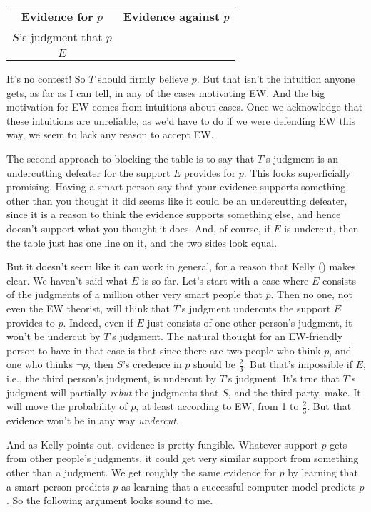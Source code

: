 \documentclass[
  11pt,
  letterpaper,
  DIV=11,
  numbers=noendperiod,
  oneside]{scrartcl}
\begin{document}
\begin{longtable}[]{@{}cc@{}}
\toprule\noalign{}
\endhead
\bottomrule\noalign{}
\endlastfoot
\textbf{Evidence for} \(p\) & \textbf{Evidence against} \(p\) \\
\(S\)'s judgment that \(p\) & \\
\(E\) & \\
\end{longtable}

It's no contest! So \(T\) should firmly believe \(p\). But that isn't
the intuition anyone gets, as far as I can tell, in any of the cases
motivating EW. And the big motivation for EW comes from intuitions about
cases. Once we acknowledge that these intuitions are unreliable, as we'd
have to do if we were defending EW this way, we seem to lack any reason
to accept EW.

The second approach to blocking the table is to say that \(T\)'s
judgment is an undercutting defeater for the support \(E\) provides for
\(p\). This looks superficially promising. Having a smart person say
that your evidence supports something other than you thought it did
seems like it could be an undercutting defeater, since it is a reason to
think the evidence supports something else, and hence doesn't support
what you thought it does. And, of course, if \(E\) is undercut, then the
table just has one line on it, and the two sides look equal.

But it doesn't seem like it can work in general, for a reason that Kelly
() makes clear. We haven't said
what \(E\) is so far. Let's start with a case where \(E\) consists of
the judgments of a million other very smart people that \(p\). Then no
one, not even the EW theorist, will think that \(T\)'s judgment
undercuts the support \(E\) provides to \(p\). Indeed, even if \(E\)
just consists of one other person's judgment, it won't be undercut by
\(T\)'s judgment. The natural thought for an EW-friendly person to have
in that case is that since there are two people who think \(p\), and one
who thinks \(\neg p\), then \(S\)'s credence in \(p\) should be
\(\frac{2}{3}\). But that's impossible if \(E\), i.e., the third
person's judgment, is undercut by \(T\)'s judgment. It's true that
\(T\)'s judgment will partially \emph{rebut} the judgments that \(S\),
and the third party, make. It will move the probability of \(p\), at
least according to EW, from 1 to \(\frac{2}{3}\). But that evidence
won't be in any way \emph{undercut}.

And as Kelly points out, evidence is pretty fungible. Whatever support
\(p\) gets from other people's judgments, it could get very similar
support from something other than a judgment. We get roughly the same
evidence for \(p\) by learning that a smart person predicts \(p\) as
learning that a successful computer model predicts \(p\). So the
following argument looks sound to me.
\end{document}
